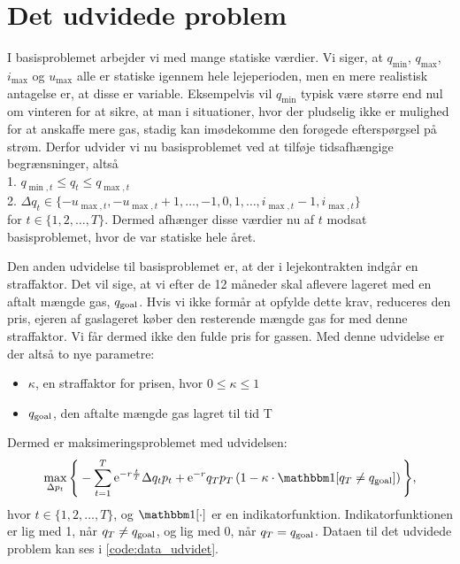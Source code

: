 \section{Det udvidede problem} \label{kap:udvidet_problem}

I basisproblemet arbejder vi med mange statiske værdier. Vi siger, at $q_{\min}$, $q_{\max}$, $i_{\max}$ og $u_{\max}$ alle er statiske igennem hele lejeperioden, men en mere realistisk antagelse er, at disse er variable. Eksempelvis vil $q_{\min}$ typisk være større end nul om vinteren for at sikre, at man i situationer, hvor der pludselig ikke er mulighed for at anskaffe mere gas, stadig kan imødekomme den forøgede efterspørgsel på strøm. Derfor udvider vi nu basisproblemet ved at tilføje tidsafhængige begrænsninger, altså\\
1. $q_{\min,t} \leq q_{t} \leq q_{\max,t}$ \\
2. $\Delta q_{t} \in \{-u_{\max,t}, -u_{\max,t} + 1, \dotsc, -1, 0, 1, \dotsc, i_{\max,t} -1, i_{\max,t} \}$ \\
for $t \in \{1,2,\dotsc,T \}$. Dermed afhænger disse værdier nu af $t$ modsat basisproblemet, hvor de var statiske hele året. 

Den anden udvidelse til basisproblemet er, at der i lejekontrakten indgår en straffaktor. Det vil sige, at vi efter de 12 måneder skal aflevere lageret med en aftalt mængde gas, $q_{\textrm{goal}}$. Hvis vi ikke formår at opfylde dette krav, reduceres den pris, ejeren af gaslageret køber den resterende mængde gas for med denne straffaktor. Vi får dermed ikke den fulde pris for gassen. Med denne udvidelse er der altså to nye parametre:
\begin{itemize}
\item $\kappa$, en straffaktor for prisen, hvor $0 \leq \kappa \leq 1$
\item $q_{\textrm{goal}}$, den aftalte mængde gas lagret til tid T
\end{itemize}
Dermed er maksimeringsproblemet med udvidelsen:
\begin{equation}
\max_{\Delta p_{t}} \Bigg\{ -\sum_{t=1}^{T} \mathrm{e}^{-r\frac{t}{T}} \Delta q_{t} p_{t}+ \mathrm{e}^{-r}q_{T}p_{T} \left (1- \kappa \cdot \ind [q_{T} \neq q_{\goal}] \right )  \Bigg\}, 
\end{equation}
hvor $t \in \{1,2,\dotsc,T \}$, og $\ind [\cdot]$ er en indikatorfunktion. Indikatorfunktionen er lig med 1, når $q_{T} \neq q_{\textrm{goal}}$, og lig med 0, når $q_{T} = q_{\textrm{goal}}$. Dataen til det udvidede problem kan ses i \autoref{code:data_udvidet}.